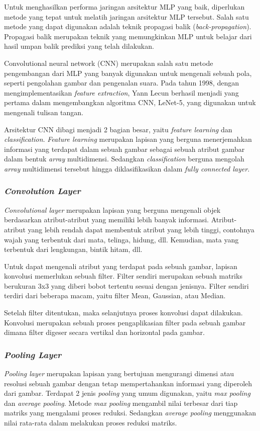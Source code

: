 Untuk menghasilkan performa jaringan arsitektur MLP yang baik, diperlukan metode yang tepat untuk melatih jaringan arsitektur MLP tersebut. Salah satu metode yang dapat digunakan adalah teknik propagasi balik (\textit{back-propagation}). Propagasi balik merupakan teknik yang memungkinkan MLP untuk belajar dari hasil umpan balik prediksi yang telah dilakukan.

Convolutional neural network (CNN) merupakan salah satu metode pengembangan dari MLP yang banyak digunakan untuk mengenali sebuah pola, seperti pengolahan gambar dan pengenalan suara. Pada tahun 1998, dengan mengimplementasikan \textit{feature extraction}, Yann Lecun berhasil menjadi yang pertama dalam mengembangkan algoritma CNN, LeNet-5, yang digunakan untuk mengenali tulisan tangan.

Arsitektur CNN dibagi menjadi 2 bagian besar, yaitu \textit{feature learning }dan \textit{classification}. \textit{Feature learning }merupakan lapisan yang berguna menerjemahkan informasi yang terdapat dalam sebuah gambar sebagai sebuah atribut gambar dalam bentuk \textit{array }multidimensi. Sedangkan \textit{classification }berguna mengolah \textit{array }multidimensi tersebut hingga diklasifikasikan dalam \textit{fully connected layer}.

\subsubsection{\textit{Convolution Layer}}
\textit{Convolutional layer }merupakan lapisan yang berguna mengenali objek berdasarkan atribut-atribut yang memiliki lebih banyak informasi. Atribut-atribut yang lebih rendah dapat membentuk atribut yang lebih tinggi, contohnya wajah yang terbentuk dari mata, telinga, hidung, dll. Kemudian, mata yang terbentuk dari lengkungan, bintik hitam, dll.

Untuk dapat mengenali atribut yang terdapat pada sebuah gambar, lapisan konvolusi memerlukan sebuah filter. Filter sendiri merupakan sebuah matriks berukuran 3x3 yang diberi bobot tertentu sesuai dengan jenisnya. Filter sendiri terdiri dari beberapa macam, yaitu filter Mean, Gaussian, atau Median.

Setelah filter ditentukan, maka selanjutnya proses konvolusi dapat dilakukan. Konvolusi merupakan sebuah proses pengaplikasian filter pada sebuah gambar dimana filter digeser secara vertikal dan horizontal pada gambar.

\subsubsection{\textit{Pooling Layer}}
\textit{Pooling layer }merupakan lapisan yang bertujuan mengurangi dimensi atau resolusi sebuah gambar dengan tetap mempertahankan informasi yang diperoleh dari gambar. Terdapat 2 jenis \textit{pooling }yang umum digunakan, yaitu \textit{max pooling }dan \textit{average pooling}. Metode \textit{max pooling }mengambil nilai terbesar dari tiap matriks yang mengalami proses reduksi. Sedangkan \textit{average pooling }menggunakan nilai rata-rata dalam melakukan proses reduksi matriks. 

